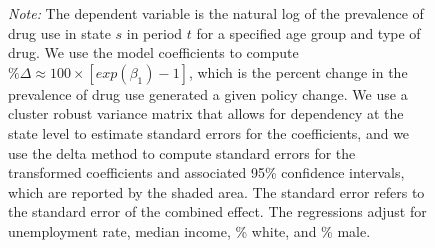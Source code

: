 \documentclass[12pt]{article}%
\begin{document}
\begin{figure}
\begin{minipage}{.9\linewidth}
\begin{subfigure}[b]{0.32\columnwidth}
    \label{fig:unbalanced_lead_lag_coke_365}
  \end{subfigure}
        \label{fig:unbalanced_lead_lag_other}
 \begin{justify}
                {\footnotesize
                    \emph{Note:} 
            The dependent variable is the natural log of the prevalence of drug use in state $s$ in period $t$ for a specified age group and type of drug. We use the model coefficients to compute $\% \Delta \approx 100\times \left[exp(\beta_1)-1\right]$, which is the percent change in the prevalence of drug use generated a given policy change.  We use a cluster robust variance matrix that allows for dependency at the state level to estimate standard errors for the coefficients, and we use the delta method to compute standard errors for the transformed coefficients and associated 95\% confidence intervals, which are reported by the shaded area. The standard error refers to the standard error of the combined effect. The regressions adjust for unemployment rate, median income, \% white, and \% male. 
                \par}
            \end{justify}
       \end{minipage}
\end{figure}



\FloatBarrier
\end{document}
